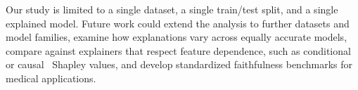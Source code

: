 Our study is limited to a single dataset, a single train/test split, and a single explained model. Future work could extend the analysis to further datasets and model families, examine how explanations vary across equally accurate models, compare against explainers that respect feature dependence, such as conditional~\cite{aas2021explaining} or causal~\cite{heskes2020causal} Shapley values, and develop standardized faithfulness benchmarks for medical applications.

